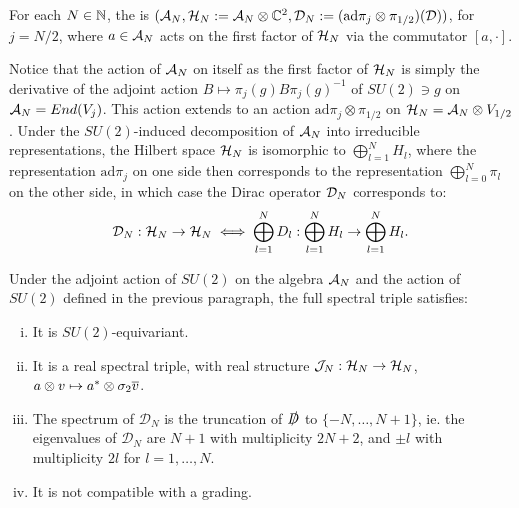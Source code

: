 \begin{definition}
For each $N \in \mathbb{N}$, the  is $(\mathcal A_N, \textcolor{black}{\mathcal H_N} := \mathcal A_N \otimes \mathbb{C}^2, \textcolor{black}{\mathcal D_N} := (\text{ad}\pi_j \otimes \pi_{1/2})(\mathcal D) )$, for $j = N/2$, where $a \in \mathcal A_N$ acts on the first factor of $\mathcal H_N$ via the commutator $[a, \cdot]$.
\end{definition}

Notice that the action of $\mathcal A_N$ on itself as the first factor of $\mathcal H_N$ is simply the derivative of the adjoint action $B \mapsto \pi_j(g) B \pi_j(g)^{-1}$ of $SU(2) \ni g$ on $\mathcal A_N = End(V_j)$. This action extends to an action $\text{ad}\pi_j \otimes \pi_{1/2}$ on $\mathcal H_N = \mathcal A_N \otimes V_{1/2}$. Under the $SU(2)$-induced decomposition of $\mathcal A_N$ into irreducible representations, the Hilbert space $\mathcal H_N$ is isomorphic to $\bigoplus_{l =1}^N H_l$, where the representation $\text{ad}\pi_j$ on one side then corresponds to the representation $\bigoplus_{l = 0}^N \pi_l$ on the other side, in which case the Dirac operator $\mathcal D_N$ corresponds to:
\begin{equation}\label{reducibleDiracDecomposition}
    \mathcal D_N : \mathcal H_N \to \mathcal H_N  \iff \bigoplus_{l =1}^N D_l: \bigoplus_{l =1}^N H_l \to \bigoplus_{l =1}^N H_l.
\end{equation}

\begin{theorem}\label{theoremReducibleSpectralTripleDiracApproximation}
Under the adjoint action of $SU(2)$ on the algebra $\mathcal A_N$ and the action of $SU(2)$ defined in the previous paragraph, the full spectral triple satisfies:
    \begin{enumerate}[(i)]
    
    \item It is $SU(2)$-equivariant.
    
    \item It is a real spectral triple, with real structure $\mathcal J_N: \mathcal H_N \to \mathcal H_N$, $a \otimes v \mapsto a^* \otimes \sigma_2 \overline{v}$.
    
    \item The spectrum of $\mathcal D_N$ is the truncation of $\slashed D$ to $\{-N, \dots, N+1\}$, ie. the eigenvalues of $\mathcal D_N$ are $N+1$ with multiplicity $2N+2$, and $\pm l$ with multiplicity $2l$ for $l = 1, \dots, N$.
    
    \item It is not compatible with a grading.
    
    \end{enumerate}
\end{theorem}

